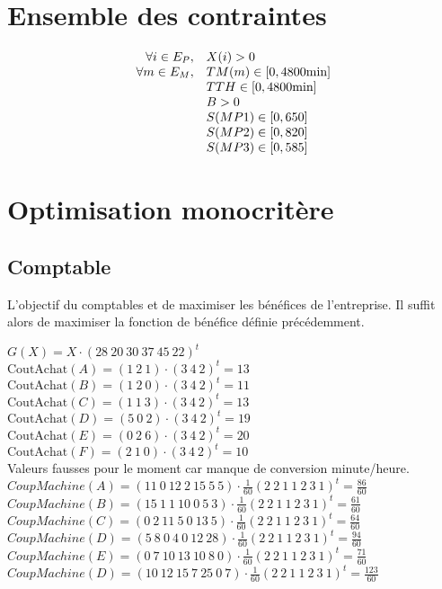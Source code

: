 \documentclass[a4paper, 11pt]{article}
\begin{document}
\section{Ensemble des contraintes}
$$
\begin{array}{r l}
    \forall i\in E_P, & X(i) > 0 \\
    \forall m\in E_M, & TM(m) \in [0, 4800\mbox{min}] \\
                      & TTH \in [0, 4800\mbox{min}] \\
                      & B > 0 \\
                      & S(MP1) \in [0, 650] \\
                      & S(MP2) \in [0, 820] \\
                      & S(MP3) \in [0, 585] \\
\end{array}
$$

\section{Optimisation monocritère}
\subsection{Comptable}
L'objectif du comptables et de maximiser les bénéfices de l'entreprise.
Il suffit alors de maximiser la fonction de bénéfice définie précédemment.

$G(X) = X\cdot(28~20~30~37~45~22)^t$ \\

$\mbox{CoutAchat}(A) = (1~2~1)\cdot(3~4~2)^t = 13$ \\
$\mbox{CoutAchat}(B) = (1~2~0)\cdot(3~4~2)^t = 11$ \\
$\mbox{CoutAchat}(C) = (1~1~3)\cdot(3~4~2)^t = 13$ \\
$\mbox{CoutAchat}(D) = (5~0~2)\cdot(3~4~2)^t = 19$ \\
$\mbox{CoutAchat}(E) = (0~2~6)\cdot(3~4~2)^t = 20$ \\
$\mbox{CoutAchat}(F) = (2~1~0)\cdot(3~4~2)^t = 10$ \\

Valeurs fausses pour le moment car manque de conversion minute/heure. \\
$CoupMachine(A) = (11~0~12~2~15~5~5)\cdot\frac{1}{60}(2~2~1~1~2~3~1)^t = \frac{86}{60}$ \\
$CoupMachine(B) = (15~1~1~10~0~5~3)\cdot\frac{1}{60}(2~2~1~1~2~3~1)^t = \frac{61}{60}$ \\
$CoupMachine(C) = (0~2~11~5~0~13~5)\cdot\frac{1}{60}(2~2~1~1~2~3~1)^t = \frac{64}{60}$ \\
$CoupMachine(D) = (5~8~0~4~0~12~28)\cdot\frac{1}{60}(2~2~1~1~2~3~1)^t = \frac{94}{60}$ \\
$CoupMachine(E) = (0~7~10~13~10~8~0)\cdot\frac{1}{60}(2~2~1~1~2~3~1)^t = \frac{71}{60}$ \\
$CoupMachine(D) = (10~12~15~7~25~0~7)\cdot\frac{1}{60}(2~2~1~1~2~3~1)^t = \frac{123}{60}$ \\
\end{document}
